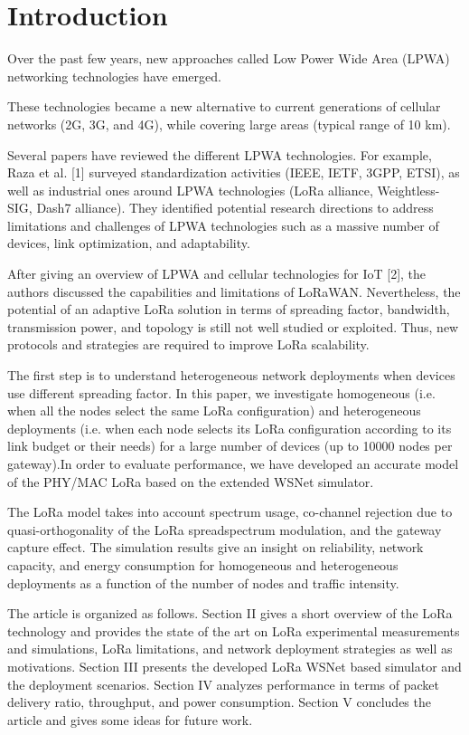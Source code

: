 \section{Introduction} \label{sec:Introduction}

Over the past few years,
	new approaches called Low Power Wide Area (LPWA) networking technologies have emerged.

These technologies became a new alternative to current generations of cellular networks (2G, 3G, and 4G),
	while covering large areas (typical range of 10 km).

Several papers have reviewed the different LPWA technologies.
For example,
	Raza et al. [1] surveyed standardization activities (IEEE, IETF, 3GPP, ETSI),
	as well as industrial ones around LPWA technologies (LoRa alliance, Weightless-SIG, Dash7 alliance).
They identified potential research directions to address limitations and challenges of LPWA technologies such as a massive number of devices,
	link optimization, and adaptability.

After giving an overview of LPWA and cellular technologies for IoT [2],
	the authors discussed the capabilities and limitations of LoRaWAN.
Nevertheless,
	the potential of an adaptive LoRa solution in terms of spreading factor,
	bandwidth,
	transmission power,
	and topology is still not well studied or exploited.
Thus,
	new protocols and strategies are required to improve LoRa scalability.

The first step is to understand heterogeneous network deployments when devices use different spreading factor.
In this paper,
	we investigate homogeneous (i.e.
when all the nodes select the same LoRa configuration) and heterogeneous deployments (i.e.
when each node selects its LoRa configuration according to its link budget or their needs) for a large number of devices (up to 10000 nodes per gateway).In order to evaluate performance,
	we have developed an accurate model of the PHY/MAC LoRa based on the extended WSNet simulator.

The LoRa model takes into account spectrum usage,
	co-channel rejection due to quasi-orthogonality of the LoRa spreadspectrum modulation,
	and the gateway capture effect.
The simulation results give an insight on reliability,
	network capacity,
	and energy consumption for homogeneous and heterogeneous deployments as a function of the number of nodes and traffic intensity.

The article is organized as follows.
Section II gives a short overview of the LoRa technology and provides the state of the art on LoRa experimental measurements and simulations,
	LoRa limitations,
	and network deployment strategies as well as motivations.
Section III presents the developed LoRa WSNet based simulator and the deployment scenarios.
Section IV analyzes performance in terms of packet delivery ratio,
	throughput,
	and power consumption.
Section V concludes the article and gives some ideas for future work.




